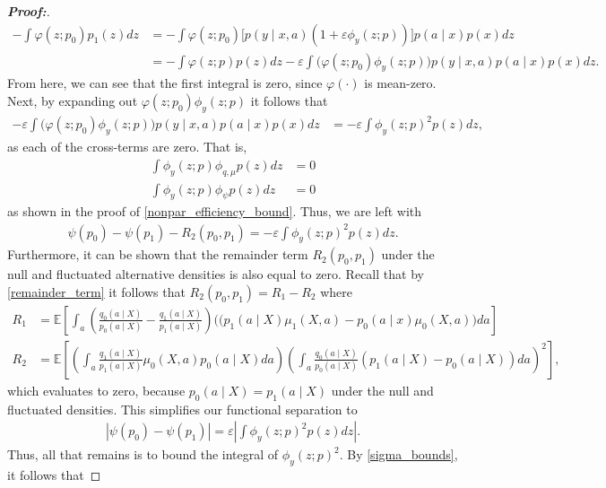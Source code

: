 \documentclass[11pt,twoside]{article}
\theoremstyle{definition}
\theoremstyle{remark}
\begin{document}
\begin{proof}[\textbf{Proof:}]
\begin{align*}
    - \int \varphi(z; p_0) p_1(z)dz &=  - \int \varphi(z; p_0) \Big[p(y \mid x, a)(1 + \varepsilon \phi_y(z; p)) \Big]p(a \mid x) p(x) dz \\
    &=  - \int \varphi(z; p) p(z) dz - \varepsilon \int \Big(\varphi(z; p_0) \phi_y(z; p)\Big) p(y \mid x, a) p(a \mid x) p(x) dz.
\end{align*}
From here, we can see that the first integral is zero, since $\varphi(\cdot)$ is mean-zero. Next, by expanding out $\varphi(z; p_0) \phi_y(z; p)$ it follows that
\begin{align*}
      - \varepsilon \int \Big(\varphi(z; p_0) \phi_y(z; p)\Big) p(y \mid x, a) p(a \mid x) p(x) dz &=  - \varepsilon \int  \phi_y(z; p)^2 p(z) dz,
\end{align*}
as each of the cross-terms are zero. That is,
\begin{align*}
    \int \phi_{y}(z; p) \phi_{q, \mu} p(z) dz &= 0 \\
    \int \phi_{y}(z; p) \phi_{\psi} p(z) dz &= 0
\end{align*}
as shown in the proof of \cref{nonpar_efficiency_bound}. Thus, we are left with
\begin{align*}
    \psi(p_0) - \psi(p_1) - R_2(p_0, p_1) = -\varepsilon \int  \phi_y(z; p)^2 p(z) dz.
\end{align*}
Furthermore, it can be shown that the remainder term $R_2(p_0, p_1)$ under the null and fluctuated alternative densities is also equal to zero. Recall that by \cref{remainder_term} it follows that $R_2(p_0, p_1) = R_1 - R_2$ where
\begin{align*}
    R_1 &= \mathbb{E} \left[\int_a \left(\frac{q_0(a \mid X)}{p_0(a \mid X)} - \frac{q_1(a \mid X)}{p_1(a \mid X)} \right)\Big((p_1(a \mid X)\mu_1(X, a) - p_0(a \mid x)\mu_0(X, a) \Big)  da \right] \\
    R_2 &= \mathbb{E} \left[\left(\int_a \frac{q_1(a \mid X)}{p_1(a \mid X)} \mu_0(X, a) p_0(a \mid X) da \right)\left(\int_a \frac{q_0(a \mid X)}{p_0(a \mid X)} (p_1(a \mid X) - p_0(a \mid X)) da \right)^2\right],
\end{align*}
which evaluates to zero, because $p_0(a \mid X) = p_1(a \mid X)$ under the null and fluctuated densities. This simplifies our functional separation to
\begin{align*}
    |\psi(p_0) - \psi(p_1)|  = \varepsilon \left| \int  \phi_y(z; p)^2 p(z) dz \right|.
\end{align*}
Thus, all that remains is to bound the integral of $\phi_y(z;p)^2$. By \cref{sigma_bounds}, it follows that 

\end{proof}
\end{document}
